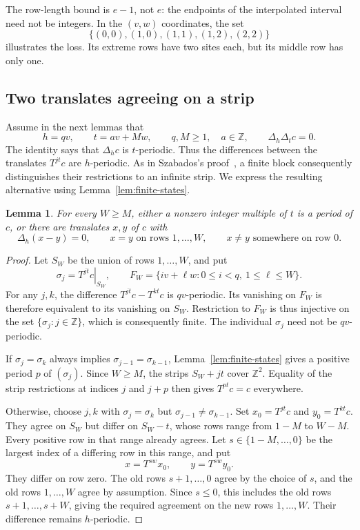 \documentclass[11pt,a4paper,reqno]{amsart}
\newtheorem{lemma}[theorem]{Lemma}
\theoremstyle{remark}
\newcommand{\Z}{\mathbb Z}
\newcommand{\De}{\Delta}
\newcommand{\restr}[2]{\left.#1\right|_{#2}}
\numberwithin{equation}{section}
\begin{document}
The row-length bound is $e-1$, not $e$: the endpoints of the interpolated interval need not be integers. In the $(v,w)$ coordinates, the set
\[
 \{(0,0),(1,0),(1,1),(1,2),(2,2)\}
\]
illustrates the loss. Its extreme rows have two sites each, but its middle row has only one.

\subsection{Two translates agreeing on a strip}
Assume in the next lemmas that
\begin{equation}\label{eq:two-normalized}
 h=qv,\qquad t=av+Mw,\qquad q,M\ge1,\quad a\in\Z,
 \qquad \De_h\De_t c=0.
\end{equation}
The identity says that $\De_h c$ is $t$-periodic. Thus the differences between the translates $T^{jt}c$ are $h$-periodic. As in Szabados's proof~\cite[Section~6]{Sz}, a finite block consequently distinguishes their restrictions to an infinite strip. We express the resulting alternative using Lemma~\ref{lem:finite-states}.

\begin{lemma}\label{lem:strip-states}
For every $W\ge M$, either a nonzero integer multiple of $t$ is a period of $c$, or there are translates $x,y$ of $c$ with
\begin{equation}\label{eq:strip-pair}
 \De_h(x-y)=0,\qquad x=y\text{ on rows }1,\ldots,W,
 \qquad x\ne y\text{ somewhere on row }0.
\end{equation}
\end{lemma}
\begin{proof}
Let $S_W$ be the union of rows $1,\ldots,W$, and put
\[
 \sigma_j=\restr{T^{jt}c}{S_W},\qquad
 F_W=\{iv+\ell w:0\le i<q,\ 1\le\ell\le W\}.
\]
For any $j,k$, the difference $T^{jt}c-T^{kt}c$ is $qv$-periodic. Its vanishing on $F_W$ is therefore equivalent to its vanishing on $S_W$. Restriction to $F_W$ is thus injective on the set $\{\sigma_j:j\in\Z\}$, which is consequently finite. The individual $\sigma_j$ need not be $qv$-periodic.

If $\sigma_j=\sigma_k$ always implies $\sigma_{j-1}=\sigma_{k-1}$, Lemma~\ref{lem:finite-states} gives a positive period $p$ of $(\sigma_j)$. Since $W\ge M$, the strips $S_W+jt$ cover $\Z^2$. Equality of the strip restrictions at indices $j$ and $j+p$ then gives $T^{pt}c=c$ everywhere.

Otherwise, choose $j,k$ with $\sigma_j=\sigma_k$ but $\sigma_{j-1}\ne\sigma_{k-1}$. Set $x_0=T^{jt}c$ and $y_0=T^{kt}c$. They agree on $S_W$ but differ on $S_W-t$, whose rows range from $1-M$ to $W-M$. Every positive row in that range already agrees. Let $s\in\{1-M,\ldots,0\}$ be the largest index of a differing row in this range, and put
\[
 x=T^{sw}x_0,\qquad y=T^{sw}y_0.
\]
They differ on row zero. The old rows $s+1,\ldots,0$ agree by the choice of $s$, and the old rows $1,\ldots,W$ agree by assumption. Since $s\le0$, this includes the old rows $s+1,\ldots,s+W$, giving the required agreement on the new rows $1,\ldots,W$. Their difference remains $h$-periodic.
\end{proof}
\end{document}
